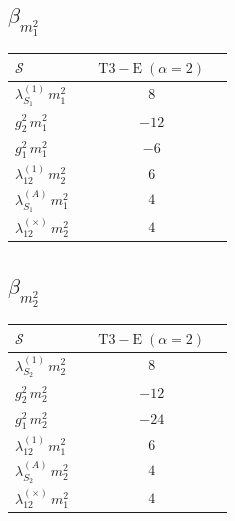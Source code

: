 \documentclass[9pt]{article}
\begin{document}
\subsection*{$ \beta_{m_1^{2}} $}
\begin{longtable}{@{}p{0.31\linewidth}c@{}}
\toprule
$\mathcal{S}$ & $ \mathrm{T3-E}\;(\alpha=2) $ \\
\midrule
$ \lambda_{S_1}^{(1)}\,m_1^{2} $ & $ 8 $ \\
$ g_2^2\,m_1^{2} $ & $ -12 $ \\
$ g_1^2\,m_1^{2} $ & $ -6 $ \\
$ \lambda_{12}^{(1)}\,m_2^{2} $ & $ 6 $ \\
$ \lambda_{S_1}^{(A)}\,m_1^{2} $ & $ 4 $ \\
$ \lambda_{12}^{(\times)}\,m_2^{2} $ & $ 4 $ \\
\bottomrule
\end{longtable}
\subsection*{$ \beta_{m_2^{2}} $}
\begin{longtable}{@{}p{0.31\linewidth}c@{}}
\toprule
$\mathcal{S}$ & $ \mathrm{T3-E}\;(\alpha=2) $ \\
\midrule
$ \lambda_{S_2}^{(1)}\,m_2^{2} $ & $ 8 $ \\
$ g_2^2\,m_2^{2} $ & $ -12 $ \\
$ g_1^2\,m_2^{2} $ & $ -24 $ \\
$ \lambda_{12}^{(1)}\,m_1^{2} $ & $ 6 $ \\
$ \lambda_{S_2}^{(A)}\,m_2^{2} $ & $ 4 $ \\
$ \lambda_{12}^{(\times)}\,m_1^{2} $ & $ 4 $ \\
\bottomrule
\end{longtable}
\end{document}
